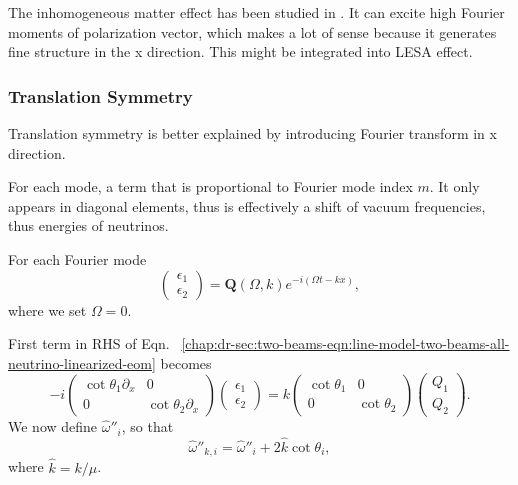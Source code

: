 The inhomogeneous matter effect has been studied in \cite{Mangano2014}. It can excite high Fourier moments of polarization vector, which makes a lot of sense because it generates fine structure in the x direction. This might be integrated into LESA effect.



\subsubsection{Translation Symmetry}


Translation symmetry is better explained by introducing Fourier transform in x direction. 

For each mode, a term that is proportional to Fourier mode index $m$. It only appears in diagonal elements, thus is effectively a shift of vacuum frequencies, thus energies of neutrinos.

For each Fourier mode
\begin{equation*}
   \begin{pmatrix}
   \epsilon_1 \\
   \epsilon_2
   \end{pmatrix} =  \mathbf Q(\Omega,k) e^{-i(\Omega t- k x)},
\end{equation*}
where we set $\Omega=0$.

First term in RHS of Eqn.~ \ref{chap:dr-sec:two-beams-eqn:line-model-two-beams-all-neutrino-linearized-eom} becomes
\begin{equation*}
   - i \begin{pmatrix}\cot\theta_1\partial_x & 0 \\
   0 & \cot\theta_2 \partial_x
   \end{pmatrix} \begin{pmatrix}
   \epsilon_1 \\
   \epsilon_2
   \end{pmatrix} = k \begin{pmatrix}\cot\theta_1 & 0 \\
   0 & \cot\theta_2
   \end{pmatrix} \begin{pmatrix}
   Q_1 \\
   Q_2
   \end{pmatrix}.
\end{equation*}
We now define $\hat\omega''_i$, so that
\begin{equation*}
   \hat\omega''_{k,i} = \hat \omega''_i + 2\hat k\cot\theta_i,
\end{equation*}
where $\hat k=k/\mu$.

